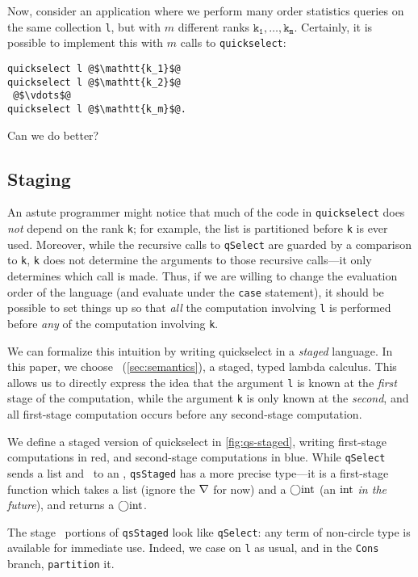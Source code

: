 \begin{concretesyntax}
Now, consider an application where we perform many order statistics queries on
the same collection \texttt{l}, but with $m$ different ranks
$\mathtt{k_1},\dots,\mathtt{k_m}$.
Certainly, it is possible to implement this with $m$ calls to
\texttt{quickselect}:
%
\begin{lstlisting}
quickselect l @$\mathtt{k_1}$@
quickselect l @$\mathtt{k_2}$@
 @$\vdots$@ 
quickselect l @$\mathtt{k_m}$@.
\end{lstlisting}
%
Can we do better?

\subsection{Staging}

An astute programmer might notice that much of the code in \texttt{quickselect}
does \emph{not} depend on the rank \texttt{k}; for example, the list is
partitioned before \texttt{k} is ever used. Moreover, while the recursive calls
to \texttt{qSelect} are guarded by a comparison to \texttt{k}, \texttt{k} does
not determine the arguments to those recursive calls---it only determines which
call is made. Thus, if we are willing to change the evaluation order of the
language (and evaluate under the \texttt{case} statement), it should be possible
to set things up so that \emph{all} the computation involving \texttt{l} is
performed before \emph{any} of the computation involving \texttt{k}.

We can formalize this intuition by writing quickselect in a \emph{staged}
language. In this paper, we choose \lang\ (\ref{sec:semantics}), a staged, typed
lambda calculus. This allows us to directly express the idea that the argument
\texttt{l} is known at the \emph{first} stage of the computation, while the
argument \texttt{k} is only known at the \emph{second}, and all
first-stage computation occurs before any second-stage computation.

We define a staged version of quickselect in \ref{fig:qs-staged}, writing
first-stage computations in red, and second-stage computations in blue. While
\texttt{qSelect} sends a \textrm{list} and \rmint\ to an \rmint,
\texttt{qsStaged} has a more precise type---it is a first-stage function which
takes a \textrm{list} (ignore the $\nabla$ for now) and a 
$\bigcirc{\rm int}$ (an ${\rm int}$ \emph{in the future}), and returns a $\bigcirc{\rm int}$. 

The stage \bbone\ portions of \texttt{qsStaged} look like \texttt{qSelect}: any
term of non-circle type is available for immediate use. Indeed, we case on
\texttt{l} as usual, and in the \texttt{Cons} branch, \texttt{partition} it.


\end{concretesyntax}
